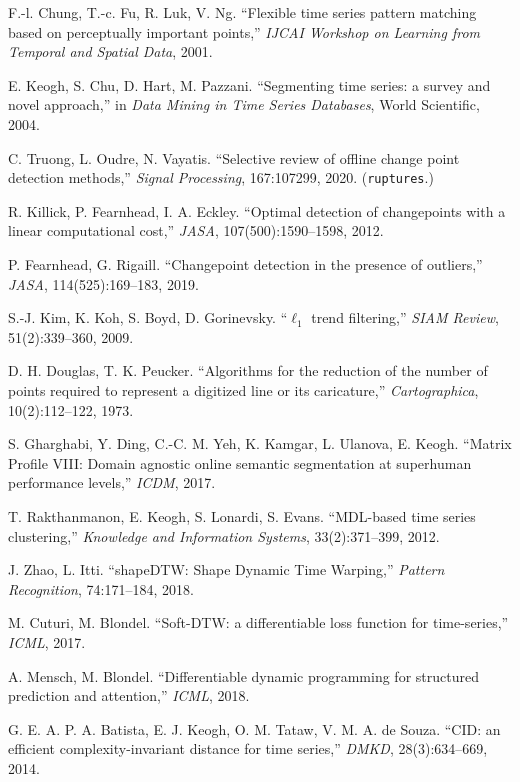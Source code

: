 \documentclass[11pt]{article}
\newcommand{\code}[1]{\texttt{\small #1}}
\begin{document}
{\small
\begin{enumerate}[leftmargin=*,itemsep=0pt,parsep=0pt,label={[\arabic*]}]
\item F.-l. Chung, T.-c. Fu, R. Luk, V. Ng. ``Flexible time series pattern matching based on
perceptually important points,'' \emph{IJCAI Workshop on Learning from Temporal and Spatial
Data}, 2001.
\item E. Keogh, S. Chu, D. Hart, M. Pazzani. ``Segmenting time series: a survey and novel
approach,'' in \emph{Data Mining in Time Series Databases}, World Scientific, 2004.
\item C. Truong, L. Oudre, N. Vayatis. ``Selective review of offline change point detection
methods,'' \emph{Signal Processing}, 167:107299, 2020. (\code{ruptures}.)
\item R. Killick, P. Fearnhead, I. A. Eckley. ``Optimal detection of changepoints with a
linear computational cost,'' \emph{JASA}, 107(500):1590--1598, 2012.
\item P. Fearnhead, G. Rigaill. ``Changepoint detection in the presence of outliers,''
\emph{JASA}, 114(525):169--183, 2019.
\item S.-J. Kim, K. Koh, S. Boyd, D. Gorinevsky. ``$\ell_1$ trend filtering,'' \emph{SIAM
Review}, 51(2):339--360, 2009.
\item D. H. Douglas, T. K. Peucker. ``Algorithms for the reduction of the number of points
required to represent a digitized line or its caricature,'' \emph{Cartographica},
10(2):112--122, 1973.
\item S. Gharghabi, Y. Ding, C.-C. M. Yeh, K. Kamgar, L. Ulanova, E. Keogh. ``Matrix Profile
VIII: Domain agnostic online semantic segmentation at superhuman performance levels,''
\emph{ICDM}, 2017.
\item T. Rakthanmanon, E. Keogh, S. Lonardi, S. Evans. ``MDL-based time series clustering,''
\emph{Knowledge and Information Systems}, 33(2):371--399, 2012.
\item J. Zhao, L. Itti. ``shapeDTW: Shape Dynamic Time Warping,'' \emph{Pattern Recognition},
74:171--184, 2018.
\item M. Cuturi, M. Blondel. ``Soft-DTW: a differentiable loss function for time-series,''
\emph{ICML}, 2017.
\item A. Mensch, M. Blondel. ``Differentiable dynamic programming for structured prediction
and attention,'' \emph{ICML}, 2018.
\item G. E. A. P. A. Batista, E. J. Keogh, O. M. Tataw, V. M. A. de Souza. ``CID: an
efficient complexity-invariant distance for time series,'' \emph{DMKD}, 28(3):634--669, 2014.

\end{enumerate}}
\end{document}
